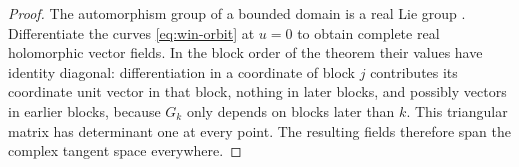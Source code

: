 \begin{proof}
The automorphism group of a bounded domain is a real Lie group \cite[Proposition~3.1 and Theorem~6.2]{Kobayashi1967}. Differentiate the curves \eqref{eq:win-orbit} at $u=0$ to obtain complete real holomorphic vector fields.  In the block order of the theorem their values have identity diagonal: differentiation in a coordinate of block $j$ contributes its coordinate unit vector in that block, nothing in later blocks, and possibly vectors in earlier blocks, because $G_k$ only depends on blocks later than $k$.  This triangular matrix has determinant one at every point.  The resulting fields therefore span the complex tangent space everywhere.
\end{proof}
